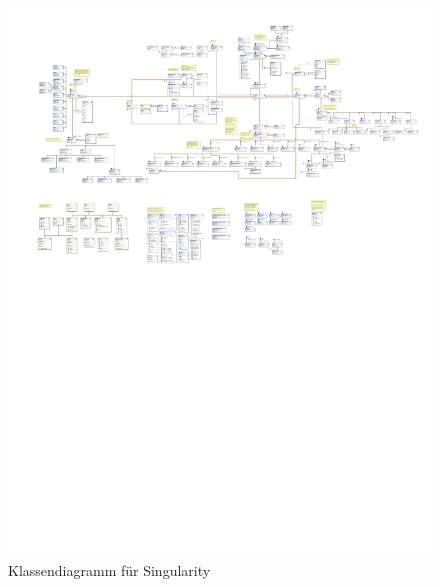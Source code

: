 \documentclass[12pt]{article}
\begin{document}
\newpage
\begin{figure}[h!]
	\centering
	\includegraphics[trim={0 14cm 0 0}, clip, width=\linewidth]{res/class.pdf}
	\caption{Klassendiagramm für Singularity}
\end{figure}
\end{document}
